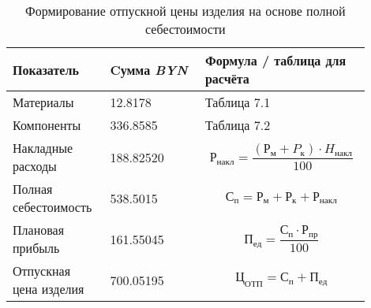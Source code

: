 \begin{table}[H]
  \small
  \caption{Формирование отпускной цены изделия на основе полной себестоимости}
\begin{tabular}{|p{0.25\linewidth}| p{0.25\linewidth} | p{0.40\linewidth}|}
  \hline
  Показатель & Cумма \textit{BYN}& Формула / таблица для расчёта\\[0pt]
  \hline
  Материалы & 12.8178 & Таблица 7.1\\[0pt]
  \hline
  Компоненты & 336.8585 & Таблица 7.2\\[0pt]
  \hline
  Накладные расходы & 188.82520 & \begin{equation}
    Р_{накл}=\frac{(Р_м+P_к) \cdot H_{накл}}{100}
    \end{equation} \\[0pt]
  \hline
  Полная себестоимость & 538.5015 & \begin{equation}
    С_п =Р_м + Р_к + Р_{накл}
    \end{equation} \\[0pt]
  \hline
  Плановая прибыль & 161.55045 &
                                 \begin{equation}
                                   П_{ед}= \frac{С_п \cdot Р_{пр}}{100}
                                 \end{equation}\\[0pt]
  \hline
  Отпускная цена изделия & 700.05195 &
                                       \begin{equation}
                                         Ц_{ОТП}=С_п+П_{ед} 
                                       \end{equation}\\[0pt]
  \hline
\end{tabular}
\end{table}


